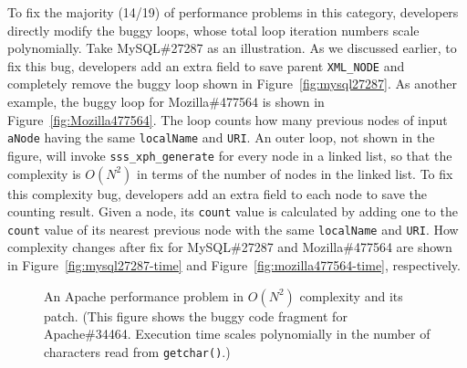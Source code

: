 To fix the majority (14/19) of performance problems in this category,
developers directly modify the buggy loops, 
whose total loop iteration numbers scale polynomially.
Take MySQL\#27287 as an illustration.
As we discussed earlier, to fix this bug,
developers add an extra field to save parent \texttt{XML\_NODE}
and completely remove the buggy loop shown in Figure~\ref{fig:mysql27287}.
As another example, the buggy loop for Mozilla\#477564 is shown in Figure~\ref{fig:Mozilla477564}.
The loop counts how many previous nodes of input \texttt{aNode} 
having the same \texttt{localName} and \texttt{URI}.
An outer loop, not shown in the figure, 
will invoke \texttt{sss\_xph\_generate} for every node in a linked list, 
so that the complexity is $O(N^2)$ in terms of the number of nodes in the linked list.
To fix this complexity bug, developers add an extra field to each node to 
save the counting result. 
Given a node, 
its \texttt{count} value is calculated by adding one 
to the \texttt{count} value of 
its nearest previous node with the same \texttt{localName} and \texttt{URI}.  
How complexity changes after fix for MySQL\#27287 and Mozilla\#477564 are 
shown in Figure~\ref{fig:mysql27287-time} and Figure~\ref{fig:mozilla477564-time}, respectively. 

\begin{figure}
\centering
{}
  \mbox{}
\caption{An Apache performance problem in $O(N^2)$ complexity and its patch. 
\footnotesize{(This figure shows the buggy code fragment for Apache\#34464. 
 Execution time scales polynomially in the number of characters read from \texttt{getchar()}.)}}
\vspace{-0.05in}
\label{fig:apache34464}
\vspace{-0.05in}
\end{figure}







